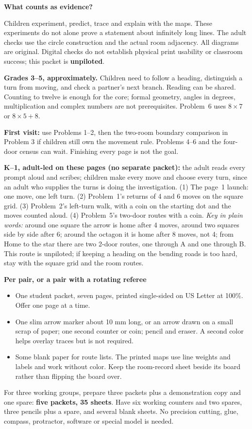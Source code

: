\documentclass[11pt]{article}
\newcommand{\topic}[1]{\vspace{4pt}{\large\bfseries #1}\par}
\newcommand{\sub}[1]{{\bfseries #1}\par}
\begin{document}
\sub{What counts as evidence?}
Children experiment, predict, trace and explain with the maps. These experiments do not alone prove a statement about infinitely long lines. The adult checks use the circle construction and the actual room adjacency. All diagrams are original. Digital checks do not establish physical print usability or classroom success; this packet is \textbf{unpiloted}.

\topic{Readiness and a realistic first route}
\textbf{Grades 3--5, approximately.} Children need to follow a heading, distinguish a turn from moving, and check a partner's next branch. Reading can be shared. Counting to twelve is enough for the core; formal geometry, angles in degrees, multiplication and complex numbers are not prerequisites. Problem~6 uses \(8\times7\) or \(8\times5+8\).

\textbf{First visit:} use Problems 1--2, then the two-room boundary comparison in Problem 3 if children still own the movement rule. Problems 4--6 and the four-door census can wait. Finishing every page is not the goal.

\textbf{K--1, adult-led on these pages (no separate packet):} the adult reads every prompt aloud and scribes; children make every move and choose every turn, since an adult who supplies the turns is doing the investigation. (1) The page~1 launch: one move, one left turn. (2) Problem~1's returns of 4 and 6 moves on the square grid. (3) Problem~2's left-turn walk, with a coin on the starting dot and the moves counted aloud. (4) Problem~5's two-door routes with a coin. \emph{Key in plain words:} around one square the arrow is home after 4 moves, around two squares side by side after 6; around the octagon it is home after 8 moves, not 4; from Home to the star there are two 2-door routes, one through A and one through B. This route is unpiloted; if keeping a heading on the bending roads is too hard, stay with the square grid and the room routes.
\newpage

\topic{Prepare the table}
\sub{Per pair, or a pair with a rotating referee}
\begin{itemize}
\item One student packet, seven pages, printed single-sided on US Letter at 100\%. Offer one page at a time.
\item One slim arrow marker about 10 mm long, or an arrow drawn on a small scrap of paper; one second counter or coin; pencil and eraser. A second color helps overlay traces but is not required.
\item Some blank paper for route lists. The printed maps use line weights and labels and work without color. Keep the room-record sheet beside its board rather than flipping the board over.
\end{itemize}
For three working groups, prepare three packets plus a demonstration copy and one spare: \textbf{five packets, 35 sheets}. Have six working counters and two spares, three pencils plus a spare, and several blank sheets. No precision cutting, glue, compass, protractor, software or special model is needed.
\end{document}
